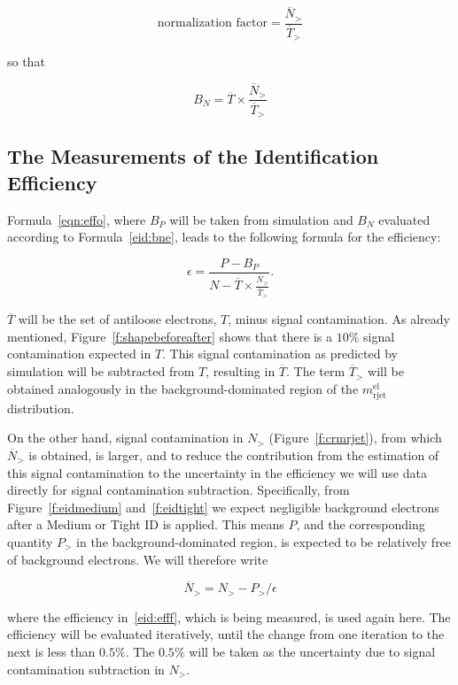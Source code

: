%
$$\text{normalization factor} = \frac{\overline{N}_>}{\overline{T}_>} $$
%

so that

\begin{equation}\label{eid:bne}
	B_N =  \overline{T} \times \frac{\overline{N}_>}{\overline{T}_>}
\end{equation}

\subsection{The Measurements of the Identification Efficiency}\label{s:meffs}

Formula~\ref{eqn:effo}, where $B_P$ will be taken from simulation and $B_N$
evaluated according to Formula~\ref{eid:bne}, leads to the following formula
for the efficiency:

\begin{equation}\label{eid:efff}
	\epsilon = \frac{P-B_P}{N - \overline{T} \times \frac{\overline{N}_>}{\overline{T}_>}}.
\end{equation}


$\overline{T}$ will be the set of antiloose electrons, $T$, minus signal
contamination. As already mentioned, Figure~\ref{f:shapebeforeafter} shows that
there is a $10\%$ signal contamination expected in $T$. This signal
contamination as predicted by simulation will be subtracted from $T$, resulting
in $\overline{T}$. The term $\overline{T}_>$ will be obtained analogously in
the background-dominated region of the $m_{\text{rjet}}^{\text{el}}$
distribution.

On the other hand, signal contamination in $N_>$ (Figure~\ref{f:crmrjet}), from
which $\overline{N}_>$ is obtained, is larger, and to reduce the contribution
from the estimation of this signal contamination to the uncertainty in the
efficiency we will use data directly for signal contamination subtraction.
Specifically, from Figure~\ref{f:eidmedium} and~\ref{f:eidtight} we expect
negligible background electrons after a Medium or Tight ID is applied. This
means $P$, and the corresponding quantity $P_>$ in the background-dominated
region, is expected to be relatively free of background electrons. We will
therefore write

%
$$\overline{N}_> = N_> - P_> / \epsilon $$
%

where the efficiency in~\ref{eid:efff}, which is being measured, is used again
here. The efficiency will be evaluated iteratively, until the change from one
iteration to the next is less than $0.5\%$. The $0.5\%$ will be taken as the
uncertainty due to signal contamination subtraction in $N_>$.

